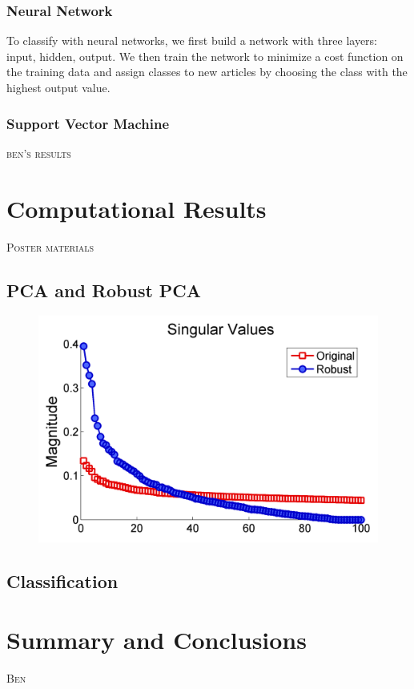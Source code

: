\documentclass[12pt]{article}
\newcommand{\comment}[1]{\textsc{\color[rgb]{1,0,0}#1}}
\begin{document}
\subsubsection{Neural Network}

To classify with neural networks, we first build a network with three
layers: input, hidden, output. We then train the network to minimize a cost function on the training data and assign classes to new articles by choosing the class with the highest output value.

\subsubsection{Support Vector Machine}

\comment{ben's results}

\section{Computational Results}
\comment{Poster materials}

\subsection{PCA and Robust PCA}
\begin{figure}[H]
\centering
\includegraphics[width=.6\textwidth]{figures/singularvaluescompare}
\end{figure}

\subsection{Classification}

\section{Summary and Conclusions}
\comment{Ben}
\end{document}
